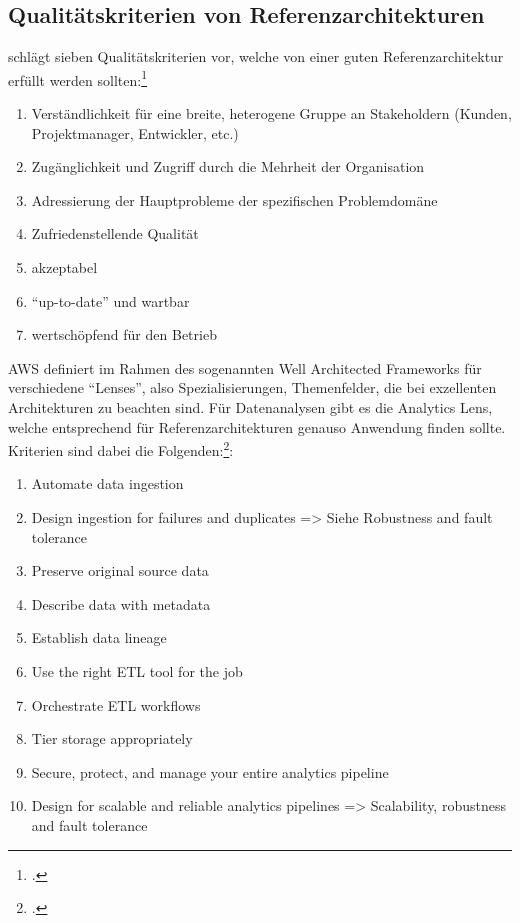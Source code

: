 \subsection{Qualitätskriterien von Referenzarchitekturen}\label{chap:qualitycriteria}
\citeauthor{Muller.2020} schlägt sieben Qualitätskriterien vor, welche von einer guten Referenzarchitektur erfüllt werden sollten:\footcite[Vgl. auch im Folgenden][8]{Muller.2020}
\begin{enumerate}
\item Verständlichkeit für eine breite, heterogene Gruppe an Stakeholdern (Kunden, Projektmanager, Entwickler, etc.)
\item Zugänglichkeit und Zugriff durch die Mehrheit der Organisation
\item Adressierung der Hauptprobleme der spezifischen Problemdomäne
\item Zufriedenstellende Qualität
\item akzeptabel
\item \enquote{up-to-date} und wartbar
\item wertschöpfend für den Betrieb
\end{enumerate}

\ac{AWS} definiert im Rahmen des sogenannten Well Architected Frameworks für verschiedene \enquote{Lenses}, also Spezialisierungen, Themenfelder, die bei exzellenten Architekturen zu beachten sind. Für Datenanalysen gibt es die Analytics Lens, welche entsprechend für Referenzarchitekturen genauso Anwendung finden sollte. Kriterien sind dabei die Folgenden:\footcite[Vgl.][6]{Ravirala.2020}:
\begin{enumerate}
\item Automate data ingestion
\item Design ingestion for failures and duplicates => Siehe Robustness and fault tolerance
\item Preserve original source data
\item Describe data with metadata
\item Establish data lineage
\item Use the right ETL tool for the job
\item Orchestrate ETL workflows
\item Tier storage appropriately
\item Secure, protect, and manage your entire analytics pipeline
\item Design for scalable and reliable analytics pipelines => Scalability, robustness and fault tolerance
\end{enumerate}


